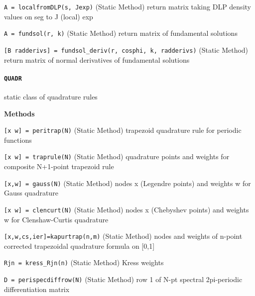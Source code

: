 {\tt A = localfromDLP(s, Jexp)} (Static Method) return matrix taking DLP density
values on seg to J (local) exp

{\tt A = fundsol(r, k)} (Static Method) return matrix of fundamental
solutions

{\tt [B radderivs] = fundsol\_deriv(r, cosphi, k, radderivs)} (Static Method) return
matrix of normal derivatives of fundamental solutions 

\newpage

\paragraph{{\tt QUADR}} static class of quadrature rules

\textbf{Methods}

{\tt [x w] = peritrap(N)} (Static Method) trapezoid quadrature rule for periodic
functions

{\tt [x w] = traprule(N)} (Static Method) quadrature points and weights for composite
N+1-point trapezoid rule

{\tt [x,w] = gauss(N)} (Static Method) nodes x (Legendre points) and weights w 
for Gauss quadrature

{\tt [x w] = clencurt(N)} (Static Method) nodes x (Chebyshev points) and weights
w for Clenshaw-Curtis quadrature

{\tt [x,w,cs,ier]=kapurtrap(n,m)} (Static Method) nodes and weights of n-point
corrected trapezoidal quadrature formula on [0,1]

{\tt Rjn = kress\_Rjn(n)} (Static Method) Kress weights

{\tt D = perispecdiffrow(N)} (Static Method) row 1 of N-pt spectral
2pi-periodic differentiation matrix














